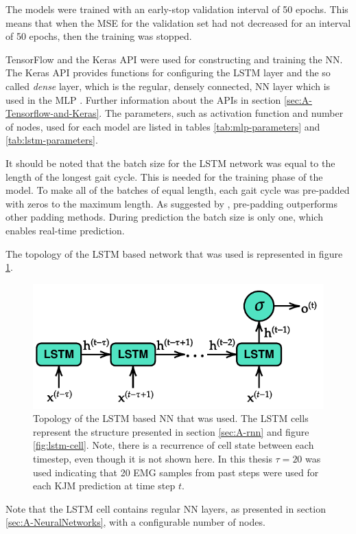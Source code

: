 \documentclass[../main.tex]{subfiles}
\begin{document}
The models were trained with an early-stop validation interval of 50 epochs.
This means that when the \ac{MSE} for the validation set had not decreased for an interval of 50 epochs, then the training was stopped.

TensorFlow \cite{tensorflow2015-whitepaper} and the Keras API \cite{chollet2015keras} were used for constructing and training the \ac{NN}.
The Keras API provides functions for configuring the \ac{LSTM} layer and the so called \textit{dense} layer, which is the regular, densely connected, \ac{NN} layer which is used in the \ac{MLP} \cite{chollet2015keras}.
Further information about the APIs in section \ref{sec:A-Tensorflow-and-Keras}.
The parameters, such as activation function and number of nodes, used for each model are listed in tables \ref{tab:mlp-parameters} and \ref{tab:lstm-parameters}.

It should be noted that the batch size for the \ac{LSTM} network was equal to the length of the longest gait cycle.
This is needed for the training phase of the model.
To make all of the batches of equal length, each gait cycle was pre-padded with zeros to the maximum length.
As suggested by \textcite{Dwarampudi2019}, pre-padding outperforms other padding methods.
During prediction the batch size is only one, which enables real-time prediction.

The topology of the \ac{LSTM} based network that was used is represented in figure \ref{fig:lstm-model-used}.
\begin{figure}[!htb]
    \centering
    \includegraphics{img/LSTM_model_used.pdf}
    \caption{Topology of the \ac{LSTM} based \ac{NN} that was used. The \ac{LSTM} cells represent the structure presented in section \ref{sec:A-rnn} and figure \ref{fig:lstm-cell}. Note, there is a recurrence of cell state between each timestep, even though it is not shown here. In this thesis $\tau = 20$ was used indicating that 20 \ac{EMG} samples from past steps were used for each \ac{KJM} prediction at time step $t$.}
    \label{fig:lstm-model-used}
\end{figure}
Note that the \ac{LSTM} cell contains regular \ac{NN} layers, as presented in section \ref{sec:A-NeuralNetworks}, with a configurable number of nodes.
\end{document}
